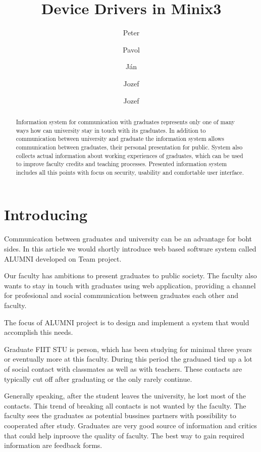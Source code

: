 \documentclass{iitsrc}[2006/14/02]
\title{Device Drivers in Minix3}
\author{Peter}{C\'ich}
\author{Pavol}{F\'abik}
\author{J\'an}{Garaj}
\author{Jozef}{Hergott}
\author{Jozef}{Hopko}
\begin{document}
\begin{abstract}
Information system for communication with graduates represents only one of many ways how can university stay in touch with its graduates. In addition to communication between university and graduate the information system allows communication between graduates, their personal presentation for public. System also collects actual information about working experiences of graduates, which can be used to improve faculty credits and teaching processes. Presented information system includes all this points with focus on security, usability and comfortable user interface.
\end{abstract}


\section{Introducing}

Communication between graduates and university can be an advantage for boht sides. In this article we would shortly introduce web based software system called ALUMNI developed on Team project. 

Our faculty has ambitions to present graduates to public society. The faculty also wants to stay in touch with graduates using web application, providing a channel for profesional and social communication between graduates each other and faculty. 

The focus of ALUMNI project is to design and implement a system that would accomplish this needs. 

Graduate FIIT STU is person, which has been studying for minimal three years or eventually more at this faculty. During this period the graduaed tied up a lot of social contact with classmates as well as with teachers. These contacts are typically cut off after graduating or the only rarely continue.

Generally speaking, after the student leaves the university, he lost most of the contacts. This trend of breaking all contacts is not wanted by the faculty. The faculty sees the graduates as potential bussines partners with possibility to cooperated after study. Graduates are very good source of information and critics that could help inproove the quality of faculty. The best way to gain required information are feedback forms.

\end{document}
